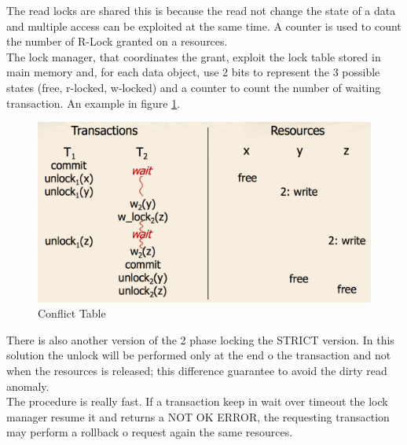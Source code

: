 \documentclass[12pt]{article}
\begin{document}
The read locks are shared this is because the read not change the state of a data and multiple access can be exploited at the same time. A counter is used to count the number of R-Lock granted on a resources.\\
The lock manager, that coordinates the grant, exploit the lock table stored in main memory and, for each data object, use 2 bits to represent the 3 possible states (free, r-locked, w-locked) and a counter to count the number of waiting transaction. An example in figure \ref{fig:TwoPhaseEx}.

\begin{figure}[h!]
  \includegraphics[width=\linewidth]{images/TwoPhaseEx.png}
  \caption{Conflict Table}
  \label{fig:TwoPhaseEx}
\end{figure}

There is also another version of the 2 phase locking the STRICT version. In this solution the unlock will be performed only at the end o the transaction and not when the resources is released; this difference guarantee to avoid the dirty read anomaly.\\
The procedure is really fast. If a transaction keep in wait over timeout the lock manager resume it and returns a NOT OK ERROR, the requesting transaction may perform a rollback o request again the same resources.




\end{document}
